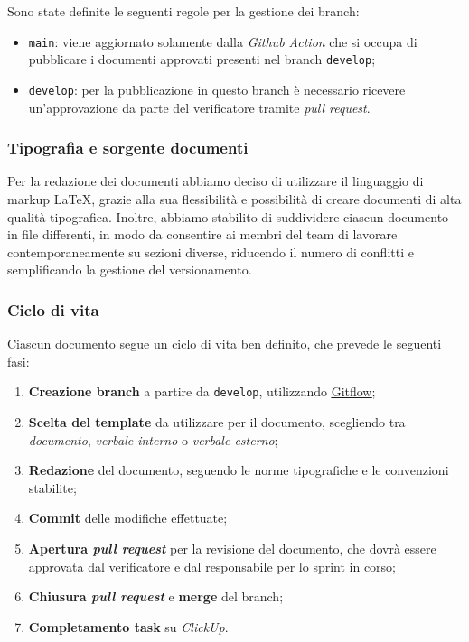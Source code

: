 Sono state definite le seguenti regole per la gestione dei branch:
\begin{itemize}
	\item \texttt{main}: viene aggiornato solamente dalla \textit{Github Action} che si occupa di pubblicare i documenti approvati presenti nel branch \texttt{develop};
	\item \texttt{develop}: per la pubblicazione in questo branch è necessario ricevere un'approvazione da parte del verificatore tramite \textit{pull request}.
\end{itemize}

\subsubsection{Tipografia e sorgente documenti}
Per la redazione dei documenti abbiamo deciso di utilizzare il linguaggio di markup LaTeX, grazie alla sua flessibilità e possibilità di creare documenti di alta qualità tipografica.
Inoltre, abbiamo stabilito di suddividere ciascun documento in file differenti, in modo da consentire ai membri del team di lavorare contemporaneamente su sezioni diverse,
riducendo il numero di conflitti e semplificando la gestione del versionamento.

\subsubsection{Ciclo di vita}
Ciascun documento segue un ciclo di vita ben definito, che prevede le seguenti fasi:
\begin{enumerate}
	\item \textbf{Creazione branch} a partire da \texttt{develop}, utilizzando \href{https://www.atlassian.com/git/tutorials/comparing-workflows/gitflow-workflow}{\underline{Gitflow}};
	\item \textbf{Scelta del template} da utilizzare per il documento, scegliendo tra \textit{documento}, \textit{verbale interno} o \textit{verbale esterno};
	\item \textbf{Redazione} del documento, seguendo le norme tipografiche e le convenzioni stabilite;
	\item \textbf{Commit} delle modifiche effettuate;
	\item \textbf{Apertura \textit{pull request}} per la revisione del documento, che dovrà essere approvata dal verificatore e dal responsabile per lo sprint in corso;
	\item \textbf{Chiusura \textit{pull request}} e \textbf{merge} del branch;
	\item \textbf{Completamento task} su \textit{ClickUp}.
\end{enumerate}


